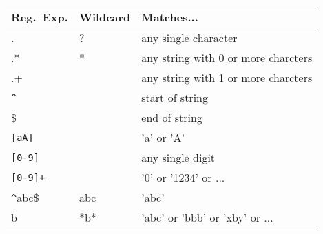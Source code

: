 \begin{center}
\begin{tabular}{l|l|l}
Reg.\ Exp.    &   Wildcard  &   Matches...  \\
\hline 
.             &   ?         &   any single character \\
.*            &   *         &   any string with 0 or more charcters \\
.+            &             &   any string with 1 or more charcters \\
\verb!^!      &             &   start of string \\
\$            &             &   end of string \\
\verb![aA]!   &             &   'a' or 'A' \\
\verb![0-9]!  &             &   any single digit \\
\verb![0-9]+! &             &   '0' or '1234' or ... \\
\verb!^!abc\$ &   abc       &   'abc' \\
b             &   *b*       &   'abc' or 'bbb' or 'xby' or ... \\
\end{tabular}
\end{center}

